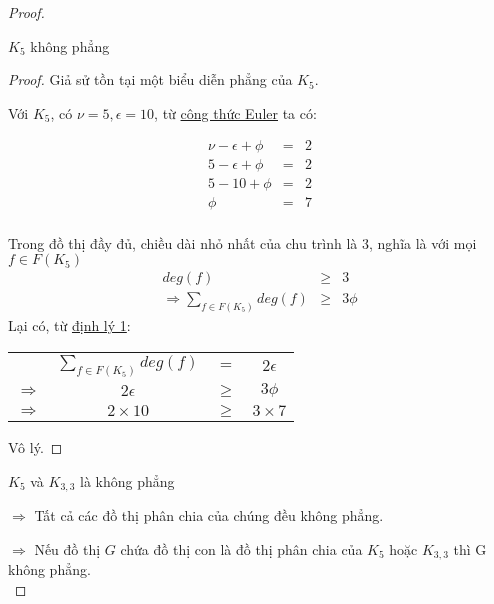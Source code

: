 \begin{proof}
    \begin{lemma}
        $K_5$ không phẳng
    \end{lemma}
    \begin{proof}
        Giả sử tồn tại một biểu diễn phẳng của $K_5$.

        Với $K_5$, có $\nu = 5, \epsilon = 10$, từ \hyperref[thr:euler]{công thức Euler} ta có:
        \begin{figure}[H]
            \begin{minipage}{0.4\textwidth}
                \begin{eqnarray*}
                    \nu-\epsilon+\phi& = &2 \\
                    5-\epsilon+\phi& = & 2\\
                    5-10+\phi& = & 2\\
                    \phi& = & 7\\
                \end{eqnarray*}
            \end{minipage}
            \hfill
            \begin{minipage}{0.4\textwidth}
                \centering
            \end{minipage}
        \end{figure}
        Trong đồ thị đầy đủ, chiều dài nhỏ nhất của chu trình là 3, nghĩa là với mọi $f \in F(K_5)$
        \begin{eqnarray*}
            deg(f)& \geq &3 \\
            \Rightarrow \sum_{f \in F(K_5)}deg(f)& \geq & 3\phi
        \end{eqnarray*}
        Lại có, từ \hyperref[thr:v2e]{định lý 1}:
        \begin{center}
            \begin{tabular}{ c c c c }
                              & $\displaystyle \sum_{f \in F(K_5)}deg(f)$ & $=$    & $2\epsilon$  \\
                $\Rightarrow$ & $2\epsilon $                              & $\geq$ & $3\phi$      \\
                $\Rightarrow$ & $2 \times 10$                             & $\geq$ & $3 \times 7$
            \end{tabular}
        \end{center}
        Vô lý.
    \end{proof}
    \begin{recap}
    \end{recap}
    $K_5$ và $K_{3,3}$ là không phẳng

    $\Rightarrow$ Tất cả các đồ thị phân chia của chúng đều không phẳng.

    $\Rightarrow$ Nếu đồ thị $G$ chứa đồ thị con là đồ thị phân chia của $K_5$ hoặc $K_{3,3}$ thì G không phẳng. \\

\end{proof}
